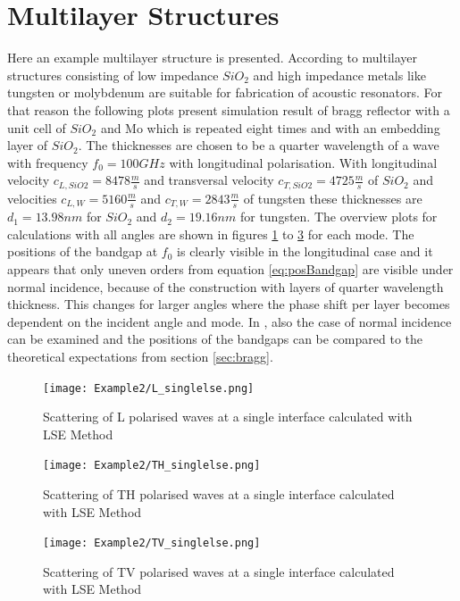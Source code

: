 \section{Multilayer Structures} \label{sec:reflector}
Here an example multilayer structure is presented. According to
\cite{Satoh2005} multilayer structures consisting of low impedance
$\si{SiO_2}$ and high impedance metals like tungsten or molybdenum are
suitable for fabrication of acoustic resonators. For that reason the following
plots present simulation result of bragg reflector with a unit cell of
$\si{SiO_2}$ and Mo which is repeated eight times and with an embedding layer
of $\si{SiO_2}$. The thicknesses are chosen to be a quarter wavelength of 
a wave with frequency $f_0=100\si{GHz}$  with
 longitudinal polarisation. With longitudinal velocity
$c_{L,SiO2}=8478\si{\frac{m}{s}}$
and transversal velocity $c_{T,SiO2} = 4725\si{\frac{m}{s}}$ of $\si{SiO_2}$ and
velocities $c_{L,W} = 5160\si{\frac{m}{s}}$ and $ c_{T,W} = 2843\si{\frac{m}{s}}$ 
of tungsten  these thicknesses are
$d_1=13.98\si{nm}$ for $\si{SiO_2}$ and $d_2 = 19.16\si{nm}$ for tungsten.
The overview plots for calculations with all angles are shown in figures
\ref{fig:totalMultiL} to \ref{fig:totalMultiTV} for each mode. The positions
of the bandgap at $f_0$ is clearly visible in the longitudinal case and it 
appears that only uneven orders from equation \ref{eq:posBandgap} are visible
under normal incidence, because of the construction with layers of 
quarter wavelength thickness. This changes for larger angles where the phase shift 
per layer becomes dependent on the incident angle and mode.
In , also the case of normal incidence can be examined
and the positions of the bandgaps can be compared to the theoretical expectations
from section \ref{sec:bragg}.


\begin{figure}[h]
    \centering
    \texttt{[image: Example2/L\_singlelse.png]}
    \caption{Scattering of L polarised waves at a single interface calculated 
    with LSE Method}
    \label{fig:totalMultiL}
\end{figure}

\begin{figure}[h]
    \centering
    \texttt{[image: Example2/TH\_singlelse.png]}
    \caption{Scattering of TH polarised waves at a single interface calculated 
    with LSE Method}
    \label{fig:totalMultiTH}
\end{figure}

\begin{figure}[h]
    \centering
    \texttt{[image: Example2/TV\_singlelse.png]}
    \caption{Scattering of TV polarised waves at a single interface calculated 
    with LSE Method}
    \label{fig:totalMultiTV}
\end{figure}
